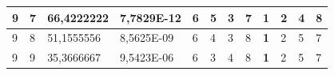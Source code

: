 \documentclass[conference]{IEEEtran}
\begin{document}
\begin{table}[]
\begin{tabular}{|llll|llllllll|}
\multicolumn{1}{|l|}{9}                                                     & \multicolumn{1}{l|}{7}                                                        & \multicolumn{1}{l|}{66,4222222}                                                   & 7,7829E-12                     & \multicolumn{1}{l|}{6}                                                  & \multicolumn{1}{l|}{5}                                                  & \multicolumn{1}{l|}{3}                                                  & \multicolumn{1}{l|}{7}                                                  & \multicolumn{1}{l|}{\textbf{1}}                                         & \multicolumn{1}{l|}{2}                                                  & \multicolumn{1}{l|}{4}                                                  & 8                          \\ \hline
\multicolumn{1}{|l|}{9}                                                     & \multicolumn{1}{l|}{8}                                                        & \multicolumn{1}{l|}{51,1555556}                                                   & 8,5625E-09                     & \multicolumn{1}{l|}{6}                                                  & \multicolumn{1}{l|}{4}                                                  & \multicolumn{1}{l|}{3}                                                  & \multicolumn{1}{l|}{8}                                                  & \multicolumn{1}{l|}{\textbf{1}}                                         & \multicolumn{1}{l|}{2}                                                  & \multicolumn{1}{l|}{5}                                                  & 7                          \\ \hline
\multicolumn{1}{|l|}{9}                                                     & \multicolumn{1}{l|}{9}                                                        & \multicolumn{1}{l|}{35,3666667}                                                   & 9,5423E-06                     & \multicolumn{1}{l|}{6}                                                  & \multicolumn{1}{l|}{3}                                                  & \multicolumn{1}{l|}{4}                                                  & \multicolumn{1}{l|}{8}                                                  & \multicolumn{1}{l|}{\textbf{1}}                                         & \multicolumn{1}{l|}{2}                                                  & \multicolumn{1}{l|}{5}                                                  & 7                          \\ \hline

\end{tabular}
\end{table}
\end{document}
